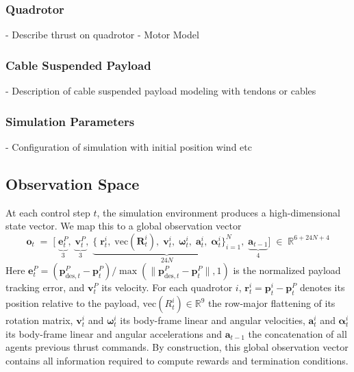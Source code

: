 \subsubsection{Quadrotor}
- Describe thrust on quadrotor
- Motor Model

\subsubsection{Cable Suspended Payload}
- Description of cable suspended payload modeling with tendons or cables
\subsubsection{Simulation Parameters}
- Configuration of simulation with initial position wind etc

\subsection{Observation Space}

At each control step \(t\), the simulation environment produces a high-dimensional state vector. We map this to a global observation vector 
\[
\mathbf{o}_t \;=\; \bigl[\;\underbrace{\mathbf{e}^P_t}_{3},\;\underbrace{\mathbf{v}^P_t}_{3},\;\underbrace{\{\;\mathbf{r}^i_t,\;\mathrm{vec}(\mathbf{R}^i_t),\;\mathbf{v}^i_t,\;\boldsymbol{\omega}^i_t,\;\mathbf{a}^i_t,\;\boldsymbol{\alpha}^i_t\}_{i=1}^N}_{24N},\;\underbrace{\mathbf{a}_{t-1}}_{4}\bigr] \;\in\;\mathbb{R}^{6 + 24N + 4}
\]
Here \(\mathbf{e}^P_t = (\mathbf{p}^P_{\mathrm{des},t}-\mathbf{p}^P_t)/\max(\|\mathbf{p}^P_{\mathrm{des},t}-\mathbf{p}^P_t\|,1)\) is the normalized payload tracking error, and \(\mathbf{v}^P_t\) its velocity.  For each quadrotor \(i\), \(\mathbf{r}^i_t=\mathbf{p}^i_t-\mathbf{p}^P_t\) denotes its position relative to the payload, \(\mathrm{vec}(R^i_t)\in\mathbb{R}^9\) the row-major flattening of its rotation matrix, \(\mathbf{v}^i_t\) and \(\boldsymbol{\omega}^i_t\) its body-frame linear and angular velocities, \(\mathbf{a}^i_t\) and \(\boldsymbol{\alpha}^i_t\) its body-frame linear and angular accelerations and \(\mathbf{a}_{t-1}\) the concatenation of all agents previous thrust commands.  By construction, this global observation vector contains all information required to compute rewards and termination conditions.

